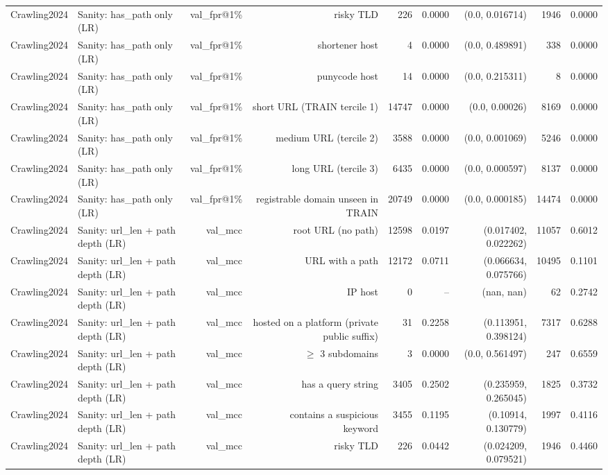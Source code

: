 \begin{table}[t]
\begin{tabular}{llrrrrrrr}
Crawling2024 & Sanity: has\_path only (LR) & val\_fpr@1\% & risky TLD & 226 & 0.0000 & (0.0, 0.016714) & 1946 & 0.0000 \\
Crawling2024 & Sanity: has\_path only (LR) & val\_fpr@1\% & shortener host & 4 & 0.0000 & (0.0, 0.489891) & 338 & 0.0000 \\
Crawling2024 & Sanity: has\_path only (LR) & val\_fpr@1\% & punycode host & 14 & 0.0000 & (0.0, 0.215311) & 8 & 0.0000 \\
Crawling2024 & Sanity: has\_path only (LR) & val\_fpr@1\% & short URL (TRAIN tercile 1) & 14747 & 0.0000 & (0.0, 0.00026) & 8169 & 0.0000 \\
Crawling2024 & Sanity: has\_path only (LR) & val\_fpr@1\% & medium URL (tercile 2) & 3588 & 0.0000 & (0.0, 0.001069) & 5246 & 0.0000 \\
Crawling2024 & Sanity: has\_path only (LR) & val\_fpr@1\% & long URL (tercile 3) & 6435 & 0.0000 & (0.0, 0.000597) & 8137 & 0.0000 \\
Crawling2024 & Sanity: has\_path only (LR) & val\_fpr@1\% & registrable domain unseen in TRAIN & 20749 & 0.0000 & (0.0, 0.000185) & 14474 & 0.0000 \\
Crawling2024 & Sanity: url\_len + path depth (LR) & val\_mcc & root URL (no path) & 12598 & 0.0197 & (0.017402, 0.022262) & 11057 & 0.6012 \\
Crawling2024 & Sanity: url\_len + path depth (LR) & val\_mcc & URL with a path & 12172 & 0.0711 & (0.066634, 0.075766) & 10495 & 0.1101 \\
Crawling2024 & Sanity: url\_len + path depth (LR) & val\_mcc & IP host & 0 & -- & (nan, nan) & 62 & 0.2742 \\
Crawling2024 & Sanity: url\_len + path depth (LR) & val\_mcc & hosted on a platform (private public suffix) & 31 & 0.2258 & (0.113951, 0.398124) & 7317 & 0.6288 \\
Crawling2024 & Sanity: url\_len + path depth (LR) & val\_mcc & $\geq$ 3 subdomains & 3 & 0.0000 & (0.0, 0.561497) & 247 & 0.6559 \\
Crawling2024 & Sanity: url\_len + path depth (LR) & val\_mcc & has a query string & 3405 & 0.2502 & (0.235959, 0.265045) & 1825 & 0.3732 \\
Crawling2024 & Sanity: url\_len + path depth (LR) & val\_mcc & contains a suspicious keyword & 3455 & 0.1195 & (0.10914, 0.130779) & 1997 & 0.4116 \\
Crawling2024 & Sanity: url\_len + path depth (LR) & val\_mcc & risky TLD & 226 & 0.0442 & (0.024209, 0.079521) & 1946 & 0.4460 \\

\end{tabular}
\end{table}
